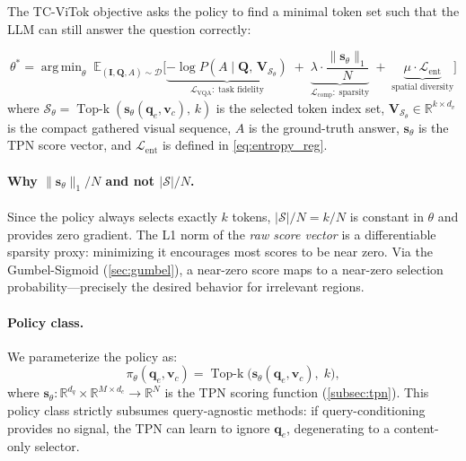 \documentclass[11pt,a4paper]{article}
\DeclareMathOperator*{\argmin}{arg\,min}
\DeclareMathOperator{\TopK}{Top\text{-}k}
\newcommand{\R}{\mathbb{R}}
\newcommand{\E}{\mathbb{E}}
\newcommand{\vc}{\mathbf{v}_c}
\newcommand{\qe}{\mathbf{q}_e}
\newcommand{\vs}{\mathbf{s}}
\newcommand{\mI}{\mathbf{I}}
\newcommand{\mQ}{\mathbf{Q}}
\newcommand{\mV}{\mathbf{V}}
\begin{document}
The TC-ViTok objective asks the policy to find a minimal token set such that
the LLM can still answer the question correctly:

\begin{definitionbox}[title={TC-ViTok Training Objective}]
\begin{equation}
  \theta^* = \argmin_{\theta} \;
    \E_{(\mI,\mQ,A)\sim\mathcal{D}} \Big[
      \underbrace{
        -\log P\!\left(A \mid \mQ,\,\mV_{\mathcal{S}_\theta}\right)
      }_{\mathcal{L}_{\mathrm{VQA}}:\;\text{task fidelity}}
      \;+\; \underbrace{
        \lambda \cdot \frac{\lVert \vs_\theta \rVert_1}{N}
      }_{\mathcal{L}_{\mathrm{comp}}:\;\text{sparsity}}
      \;+\; \underbrace{
        \mu \cdot \mathcal{L}_{\mathrm{ent}}
      }_{\text{spatial diversity}}
    \Big]
  \label{eq:objective}
\end{equation}
where $\mathcal{S}_\theta = \TopK(\vs_\theta(\qe,\vc),\, k)$ is the selected
token index set, $\mV_{\mathcal{S}_\theta} \in \R^{k \times d_v}$ is the
compact gathered visual sequence, $A$ is the ground-truth answer,
$\vs_\theta$ is the TPN score vector, and $\mathcal{L}_{\mathrm{ent}}$ is
defined in \cref{eq:entropy_reg}.
\end{definitionbox}

\paragraph{Why $\lVert\vs_\theta\rVert_1/N$ and not $|\mathcal{S}|/N$.}
Since the policy always selects exactly $k$ tokens,
$|\mathcal{S}|/N = k/N$ is constant in $\theta$ and provides zero gradient.
The L1 norm of the \emph{raw score vector} is a differentiable sparsity
proxy: minimizing it encourages most scores to be near zero.
Via the Gumbel-Sigmoid (\cref{sec:gumbel}), a near-zero score maps to a
near-zero selection probability---precisely the desired behavior for
irrelevant regions.

\paragraph{Policy class.}
We parameterize the policy as:
\begin{equation}
  \pi_\theta(\qe,\vc) = \TopK\!\bigl(\vs_\theta(\qe,\vc),\; k\bigr),
  \label{eq:policy_class}
\end{equation}
where $\vs_\theta\colon \R^{d_q} \times \R^{M \times d_c} \to \R^N$ is the
TPN scoring function (\cref{subsec:tpn}).
This policy class strictly subsumes query-agnostic methods: if
query-conditioning provides no signal, the TPN can learn to ignore $\qe$,
degenerating to a content-only selector.
\end{document}
